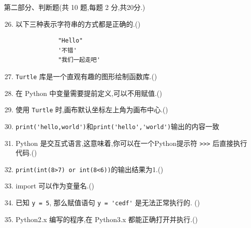\documentclass[11pt]{ctexart}
\begin{document}
    {\noindent\heiti 第二部分、判断题(共 10 题,每题 2 分,共20分.)}
    \begin{enumerate}
        \setcounter{enumi}{25}
        \item 以下三种表示字符串的方式都是正确的.(\qquad)
        \begin{lstlisting}
            "Hello"
            '不错'
            "我们一起走吧'
        \end{lstlisting}

        \item \lstinline{Turtle} 库是一个直观有趣的图形绘制函数库.(\qquad)
        
        \item 在 Python 中变量需要提前定义,可以不用赋值.(\qquad)
  
        \item 使用 \lstinline{Turtle} 时,画布默认坐标左上角为画布中心.(\qquad)
        
        \item \lstinline{print('hello,world')}和\lstinline{print('hello','world')}输出的内容一致
        
        \item Python 是交互式语言,这意味着,你可以在一个Python提示符 \lstinline!>>>! 后直接执行代码.(\qquad)
        
        \item \lstinline{print(int(8>7) or int(8<6))}的输出结果为1.(\qquad)
        
        \item import 可以作为变量名.(\qquad)
        
        \item 已知 \lstinline{y = 5}, 那么赋值语句 \lstinline{y = 'cedf'} 是无法正常执行的. (\qquad)
        
        \item Python2.x 编写的程序,在 Python3.x 都能正确打开并执行.(\qquad)
    \end{enumerate}
\end{document}
